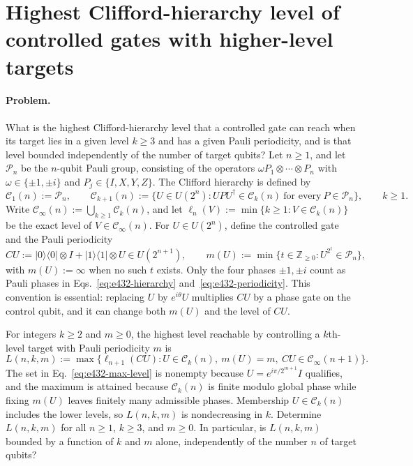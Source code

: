 \section{Highest Clifford-hierarchy level of controlled gates with higher-level targets}
\label{sec:op_e432fc5ff73e63be}

\paragraph{Problem.}
What is the highest Clifford-hierarchy level that a controlled gate can
reach when its target lies in a given level $k\geq3$ and has a given Pauli
periodicity, and is that level bounded independently of the number of target
qubits?  Let $n\geq1$, and let $\mathcal P_n$ be the $n$-qubit Pauli group,
consisting of the operators $\omega P_1\otimes\cdots\otimes P_n$ with
$\omega\in\{\pm1,\pm i\}$ and $P_j\in\{I,X,Y,Z\}$.  The Clifford hierarchy is
defined by
\begin{equation}
  \mathcal C_1(n):=\mathcal P_n,
  \qquad
  \mathcal C_{k+1}(n):=\bigl\{U\in U(2^n):UPU^\dagger\in\mathcal C_k(n)
    \ \text{for every}\ P\in\mathcal P_n\bigr\},
  \qquad k\geq1.
  \label{eq:e432-hierarchy}
\end{equation}
Write $\mathcal C_\infty(n):=\bigcup_{k\geq1}\mathcal C_k(n)$, and let
$\ell_n(V):=\min\{k\geq1:V\in\mathcal C_k(n)\}$ be the exact level of
$V\in\mathcal C_\infty(n)$.  For $U\in U(2^n)$, define the controlled gate and
the Pauli periodicity
\begin{equation}
  CU:=|0\rangle\langle0|\otimes I+|1\rangle\langle1|\otimes U\in U(2^{n+1}),
  \qquad
  m(U):=\min\bigl\{t\in\mathbb Z_{\geq0}:U^{2^t}\in\mathcal P_n\bigr\},
  \label{eq:e432-periodicity}
\end{equation}
with $m(U):=\infty$ when no such $t$ exists.  Only the four phases
$\pm1,\pm i$ count as Pauli phases in Eqs.~\eqref{eq:e432-hierarchy}
and~\eqref{eq:e432-periodicity}.  This convention is essential: replacing $U$
by $e^{i\theta}U$ multiplies $CU$ by a phase gate on the control qubit, and it
can change both $m(U)$ and the level of $CU$.

For integers $k\geq2$ and $m\geq0$, the highest level reachable by controlling
a $k$th-level target with Pauli periodicity $m$ is
\begin{equation}
  L(n,k,m):=\max\bigl\{\ell_{n+1}(CU):
    U\in\mathcal C_k(n),\ m(U)=m,\ CU\in\mathcal C_\infty(n+1)\bigr\}.
  \label{eq:e432-max-level}
\end{equation}
The set in Eq.~\eqref{eq:e432-max-level} is nonempty because
$U=e^{i\pi/2^{m+1}}I$ qualifies, and the maximum is attained because
$\mathcal C_k(n)$ is finite modulo global phase while fixing $m(U)$ leaves
finitely many admissible phases.  Membership $U\in\mathcal C_k(n)$ includes the
lower levels, so $L(n,k,m)$ is nondecreasing in $k$.  Determine $L(n,k,m)$ for
all $n\geq1$, $k\geq3$, and $m\geq0$.  In particular, is $L(n,k,m)$ bounded by
a function of $k$ and $m$ alone, independently of the number $n$ of target
qubits?

